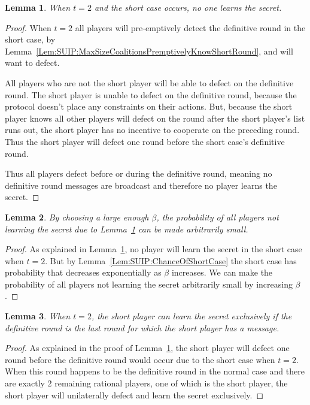 \documentclass{dalcsthesis}
\newtheorem{lemma}{Lemma}
\begin{document}
\begin{lemma}\label{Lem:SUIP:MinimumThresholdAndShortCaseMeansNoOneLearnsSecret}When $t=2$ and the short case occurs, no one learns the secret.\end{lemma}
\begin{proof}
When $t=2$ all players will pre-emptively detect the definitive round in the short case, by Lemma~\ref{Lem:SUIP:MaxSizeCoalitionsPremptivelyKnowShortRound}, and will want to defect.

All players who are not the short player will be able to defect on the definitive round. The short player is unable to defect on the definitive round, because the protocol doesn't place any constraints on their actions. But, because the short player knows all other players will defect on the round after the short player's list runs out, the short player has no incentive to cooperate on the preceding round. Thus the short player will defect one round before the short case's definitive round.

Thus all players defect before or during the definitive round, meaning no definitive round messages are broadcast and therefore no player learns the secret.
\end{proof}

\begin{lemma}\label{Lem:SUIP:NoPlayerLearningSecretIsReducible}By choosing a large enough $\beta$, the probability of all players not learning the secret due to Lemma~\ref{Lem:SUIP:MinimumThresholdAndShortCaseMeansNoOneLearnsSecret} can be made arbitrarily small.\end{lemma} 
\begin{proof}
As explained in Lemma~\ref{Lem:SUIP:MinimumThresholdAndShortCaseMeansNoOneLearnsSecret}, no player will learn the secret in the short case when $t=2$. But by Lemma~\ref{Lem:SUIP:ChanceOfShortCase} the short case has probability that decreases exponentially as $\beta$ increases. We can make the probability of all players not learning the secret arbitrarily small by increasing $\beta$.
\end{proof}

\begin{lemma}\label{Lem:SUIP:ShortPlayerMayLearnSecretExclusively}When $t=2$, the short player can learn the secret exclusively if the definitive round is the last round for which the short player has a message.\end{lemma} 
\begin{proof}
As explained in the proof of Lemma~\ref{Lem:SUIP:MinimumThresholdAndShortCaseMeansNoOneLearnsSecret}, the short player will defect one round before the definitive round would occur due to the short case when $t=2$. When this round happens to be the definitive round in the normal case and there are exactly 2 remaining rational players, one of which is the short player, the short player will unilaterally defect and learn the secret exclusively.
\end{proof}
\end{document}
